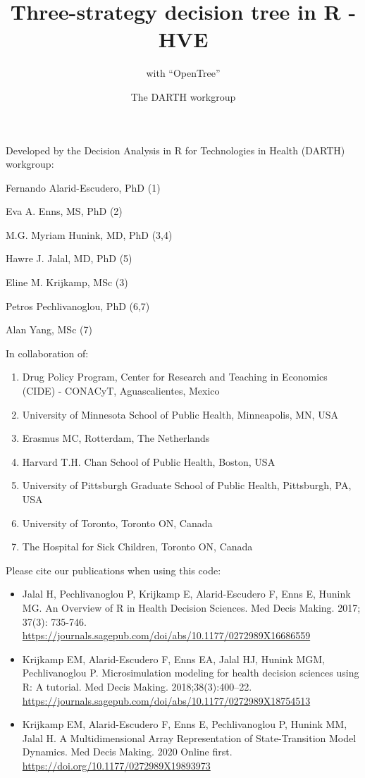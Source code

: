 \documentclass[
]{article}
\title{Three-strategy decision tree in R - HVE}
\subtitle{with ``OpenTree''}
\author{The DARTH workgroup}
\date{}
\providecommand{\tightlist}{%
  \setlength{\itemsep}{0pt}\setlength{\parskip}{0pt}}
\begin{document}
\maketitle

Developed by the Decision Analysis in R for Technologies in Health
(DARTH) workgroup:

Fernando Alarid-Escudero, PhD (1)

Eva A. Enns, MS, PhD (2)

M.G. Myriam Hunink, MD, PhD (3,4)

Hawre J. Jalal, MD, PhD (5)

Eline M. Krijkamp, MSc (3)

Petros Pechlivanoglou, PhD (6,7)

Alan Yang, MSc (7)

In collaboration of:

\begin{enumerate}
\def\labelenumi{\arabic{enumi}.}
\tightlist
\item
  Drug Policy Program, Center for Research and Teaching in Economics
  (CIDE) - CONACyT, Aguascalientes, Mexico
\item
  University of Minnesota School of Public Health, Minneapolis, MN, USA
\item
  Erasmus MC, Rotterdam, The Netherlands
\item
  Harvard T.H. Chan School of Public Health, Boston, USA
\item
  University of Pittsburgh Graduate School of Public Health, Pittsburgh,
  PA, USA
\item
  University of Toronto, Toronto ON, Canada
\item
  The Hospital for Sick Children, Toronto ON, Canada
\end{enumerate}

Please cite our publications when using this code:

\begin{itemize}
\item
  Jalal H, Pechlivanoglou P, Krijkamp E, Alarid-Escudero F, Enns E,
  Hunink MG. An Overview of R in Health Decision Sciences. Med Decis
  Making. 2017; 37(3): 735-746.
  \url{https://journals.sagepub.com/doi/abs/10.1177/0272989X16686559}
\item
  Krijkamp EM, Alarid-Escudero F, Enns EA, Jalal HJ, Hunink MGM,
  Pechlivanoglou P. Microsimulation modeling for health decision
  sciences using R: A tutorial. Med Decis Making. 2018;38(3):400--22.
  \url{https://journals.sagepub.com/doi/abs/10.1177/0272989X18754513}
\item
  Krijkamp EM, Alarid-Escudero F, Enns E, Pechlivanoglou P, Hunink MM,
  Jalal H. A Multidimensional Array Representation of State-Transition
  Model Dynamics. Med Decis Making. 2020 Online first.
  \url{https://doi.org/10.1177/0272989X19893973}
\end{itemize}
\end{document}
